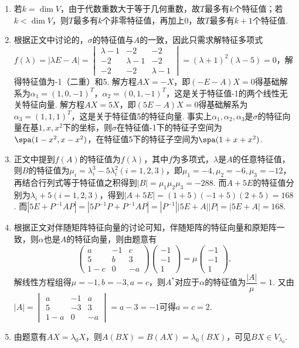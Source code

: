 \begin{enumerate}
    \item 若$k=\dim V$，由于代数重数大于等于几何重数，故$T$最多有$k$个特征值；若$k<\dim V$，则$T$最多有$k$个非零特征值，再加上0，故$T$最多有$k+1$个特征值.

    \item 根据正文中讨论的，$\sigma$的特征值与$A$的一致，因此只需求解特征多项式$f(\lambda)=|\lambda E-A|=\begin{vmatrix}
        \lambda-1 & -2 & -2 \\
        -2 & \lambda-1 & -2 \\
        -2 & -2 & \lambda-1
    \end{vmatrix}=(\lambda+1)^2(\lambda-5)=0$，解得特征值为-1（二重）和5. 解方程$AX=-X$，即$(-E-A)X=0$得基础解系为$\alpha_1=(1,0,-1)^T$，$\alpha_2=(0,1,-1)^T$，这是关于特征值-1的两个线性无关特征向量. 解方程$AX=5X$，即$(5E-A)X=0$得基础解系为$\alpha_3=(1,1,1)^T$，这是关于特征值5的特征向量. 事实上$\alpha_1,\alpha_2,\alpha_3$是$\sigma$的特征向量在基$1,x,x^2$下的坐标，则$\sigma$在特征值-1下的特征子空间为$\spa(1-x^2,x-x^2)$，在特征值5下的特征子空间为$\spa(1+x+x^2)$.

    \item 正文中提到$f(A)$的特征值为$f(\lambda)$，其中$f$为多项式，$\lambda$是$A$的任意特征值，则$B$的特征值为$\mu_i=\lambda_i^3-5\lambda_i^2(i=1,2,3)$，即$\mu_1=-4,\mu_2=-6,\mu_3=-12$，再结合行列式等于特征值之积得到$|B|=\mu_1\mu_2\mu_3=-288$. 而$A+5E$的特征值分别为$\lambda_i+5(i=1,2,3)$，得到$|A+5E|=(1+5)(-1+5)(2+5)=168$. 而$|5E+P^{-1}AP|=|5P^{-1}P+P^{-1}AP|=|P^{-1}||5E+A||P|=|5E+A|=168$.

    \item 根据正文对伴随矩阵特征向量的讨论可知，伴随矩阵的特征向量和原矩阵一致，则$\alpha$也是$A$的特征向量，则由题意有
    \[\begin{pmatrix}
        a & -1 & c \\ 5 & b & 3 \\ 1-c & 0 & -a
    \end{pmatrix}\begin{pmatrix}
        -1 \\ -1 \\ 1
    \end{pmatrix}=\mu\begin{pmatrix}
        -1 \\ -1 \\ 1
    \end{pmatrix},\]
    解线性方程组得$\mu=-1,b=-3,a=c$，则$A^*$对应于$\alpha$的特征值为$\dfrac{|A|}{\mu}=1$. 又由$|A|=\begin{vmatrix}
        a & -1 & a \\ 5 & -3 & 3 \\ 1-a & 0 & -a
    \end{vmatrix}=a-3=-1$可得$a=c=2$.

    \item \label{ex:18:交换基础} 由题意有$AX=\lambda_0X$，则$A(BX)=B(AX)=\lambda_0(BX)$，可见$BX\in V_{\lambda_0}$.
\end{enumerate}

